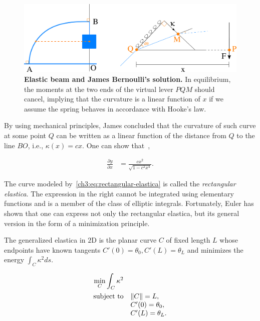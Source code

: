 \begin{figure}
\center
\includegraphics[scale=0.36]{figures/chapter3/elastica/james-scheme.png}
\caption{\textbf{Elastic beam and James Bernoulli's solution.} In equilibrium, the moments at the two ends of the virtual lever $PQM$ should cancel, implying that the curvature is a linear function of $x$ if we assume the spring behaves in accordance with Hooke's law.}
\label{ch3:fig:james-scheme-elastica}
\end{figure}

By using mechanical principles, James concluded that the curvature of such curve at some point $Q$ can be written as a linear function of the distance from $Q$ to the line $BO$, i.e., $\kappa(x) = cx$. One can show that~\cite{levien08elastica,truesdell60rational},

\begin{align}
	\frac{\partial y}{\partial x} &= \frac{cx^2}{ \sqrt{1-c^2x^4} }.
	\label{ch3:eq:rectangular-elastica}
\end{align}

The curve modeled by~\cref{ch3:eq:rectangular-elastica} is called the \emph{rectangular elastica}. The expression in the right cannot be integrated using elementary functions and is a member of the class of elliptic integrals. Fortunately, Euler has shown that one can express not only the rectangular elastica, but its general version in the form of a minimization principle. 

The generalized elastica in $2$D is the planar curve $C$ of fixed length $L$ whose endpoints have known tangents $C'(0)=\theta_0,C'(L)=\theta_L$ and minimizes the energy $\int_{C} \kappa^2 ds$.

\begin{align*}
	\begin{array}{rl}
		\displaystyle \min_{C} \int_{C}{\kappa ^2} \\[1em]
		\text{subject to}& \lVert C\rVert = L,\\
		& C'(0) = \theta_0, \\
		& C'(L) = \theta_L.
	\end{array}	
\end{align*}

